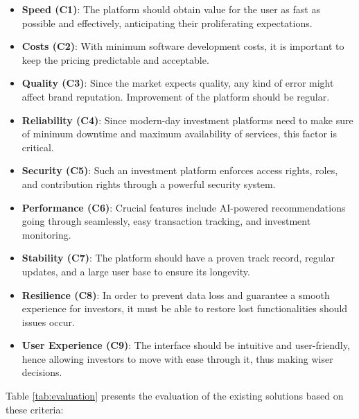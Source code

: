 \begin{itemize}
    \item \textbf{Speed (C1)}: The platform should obtain value for the user as fast as possible and effectively, anticipating their proliferating expectations.
    \item \textbf{Costs (C2)}: With minimum software development costs, it is important to keep the pricing predictable and acceptable.
    \item \textbf{Quality (C3)}: Since the market expects quality, any kind of error might affect brand reputation. Improvement of the platform should be regular.
    \item \textbf{Reliability (C4)}: Since modern-day investment platforms need to make sure of minimum downtime and maximum availability of services, this factor is critical.
    \item \textbf{Security (C5)}: Such an investment platform enforces access rights, roles, and contribution rights through a powerful security system.
    \item \textbf{Performance (C6)}: Crucial features include AI-powered recommendations going through seamlessly, easy transaction tracking, and investment monitoring.
    \item \textbf{Stability (C7)}: The platform should have a proven track record, regular updates, and a large user base to ensure its longevity.
    \item \textbf{Resilience (C8)}: In order to prevent data loss and guarantee a smooth experience for investors, it must be able to restore lost functionalities should issues occur.
    \item \textbf{User Experience (C9)}: The interface should be intuitive and user-friendly, hence allowing investors to move with ease through it, thus making wiser decisions.
\end{itemize}

Table \ref{tab:evaluation} presents the evaluation of the existing solutions based on these criteria:

